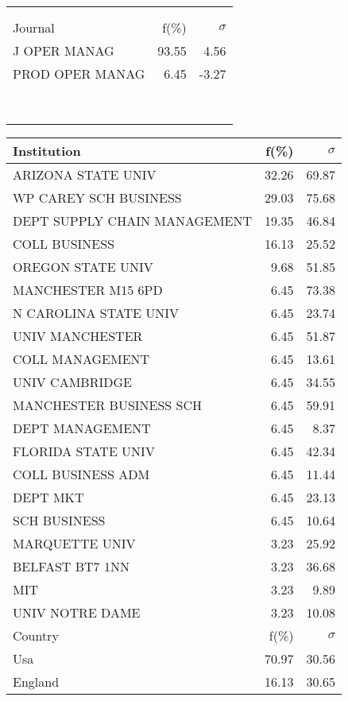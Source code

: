\documentclass[a4paper,11pt]{report}
\begin{document}
\begin{landscape}
\begin{table}[!ht]
{\begin{tabular}{|l r  r|}
 &  & \\
 &  & \\
\hline
\hline
Journal & f(\%) & $\sigma$\\
\hline
J OPER MANAG & 93.55 & 4.56\\
PROD OPER MANAG & 6.45 & -3.27\\
 &  & \\
 &  & \\
 &  & \\
 &  & \\
 &  & \\
 &  & \\
 &  & \\
 &  & \\
\hline
\end{tabular}
}
{\scriptsize\begin{tabular}{|l r r|}
\hline
Institution & f(\%) & $\sigma$\\
\hline
ARIZONA STATE UNIV & 32.26 & 69.87\\
WP CAREY SCH BUSINESS & 29.03 & 75.68\\
DEPT SUPPLY CHAIN MANAGEMENT & 19.35 & 46.84\\
COLL BUSINESS & 16.13 & 25.52\\
OREGON STATE UNIV & 9.68 & 51.85\\
MANCHESTER M15 6PD & 6.45 & 73.38\\
N CAROLINA STATE UNIV & 6.45 & 23.74\\
UNIV MANCHESTER & 6.45 & 51.87\\
COLL MANAGEMENT & 6.45 & 13.61\\
UNIV CAMBRIDGE & 6.45 & 34.55\\
MANCHESTER BUSINESS SCH & 6.45 & 59.91\\
DEPT MANAGEMENT & 6.45 & 8.37\\
FLORIDA STATE UNIV & 6.45 & 42.34\\
COLL BUSINESS ADM & 6.45 & 11.44\\
DEPT MKT & 6.45 & 23.13\\
SCH BUSINESS & 6.45 & 10.64\\
MARQUETTE UNIV & 3.23 & 25.92\\
BELFAST BT7 1NN & 3.23 & 36.68\\
MIT & 3.23 & 9.89\\
UNIV NOTRE DAME & 3.23 & 10.08\\
\hline
\hline
Country & f(\%) & $\sigma$\\
\hline
Usa & 70.97 & 30.56\\
England & 16.13 & 30.65\\

\end{tabular}}
\end{table}
\end{landscape}
\end{document}
